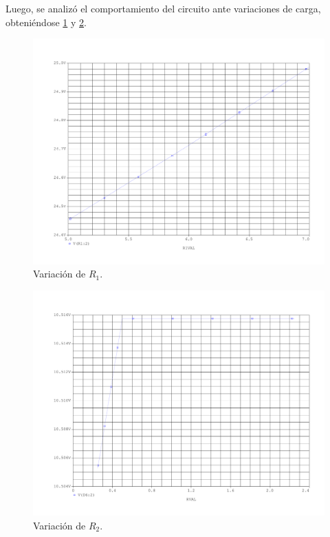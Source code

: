 Luego, se analizó el comportamiento del circuito ante variaciones de carga, obteniéndose \ref{fig:var_R1} y \ref{fig:var_R2}.

\begin{figure}[H]
	\centering
	\includegraphics[scale=0.5]{Figuras/2_var_R1.pdf}
	\caption{Variación de $R_1$.}
	\label{fig:var_R1}
\end{figure}




\begin{figure}[H]
	\centering
	\includegraphics[scale=0.5]{Figuras/2_var_R2.pdf}
	\caption{Variación de $R_2$.}
	\label{fig:var_R2}
\end{figure}



